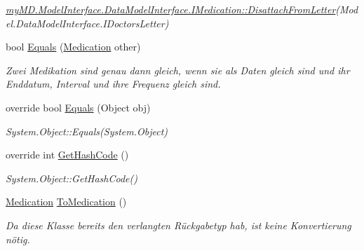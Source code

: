 \begin{CompactItemize}
\begin{CompactList}\small\item\em \hyperlink{interfacemy_m_d_1_1_model_interface_1_1_data_model_interface_1_1_i_medication_d1ca6f76b75fe87eac94cbac8bc61322}{my\-MD.Model\-Interface.Data\-Model\-Interface.IMedication::Disattach\-From\-Letter}(Model.Data\-Model\-Interface.IDoctors\-Letter) \item\end{CompactList}\item 
bool \hyperlink{classmy_m_d_1_1_model_1_1_data_model_1_1_medication_9382c5f1e8e2c50f096f26ce77672d81}{Equals} (\hyperlink{classmy_m_d_1_1_model_1_1_data_model_1_1_medication}{Medication} other)
\begin{CompactList}\small\item\em Zwei Medikation sind genau dann gleich, wenn sie als Daten gleich sind und ihr Enddatum, Interval und ihre Frequenz gleich sind. \item\end{CompactList}\item 
\hypertarget{classmy_m_d_1_1_model_1_1_data_model_1_1_medication_438d2c1653522e9aff51f785434e952d}{
override bool \hyperlink{classmy_m_d_1_1_model_1_1_data_model_1_1_medication_438d2c1653522e9aff51f785434e952d}{Equals} (Object obj)}
\label{d0/daf/classmy_m_d_1_1_model_1_1_data_model_1_1_medication_438d2c1653522e9aff51f785434e952d}

\begin{CompactList}\small\item\em System.Object::Equals(System.Object) \item\end{CompactList}\item 
\hypertarget{classmy_m_d_1_1_model_1_1_data_model_1_1_medication_871aff832c00675bb79db4294f382e58}{
override int \hyperlink{classmy_m_d_1_1_model_1_1_data_model_1_1_medication_871aff832c00675bb79db4294f382e58}{Get\-Hash\-Code} ()}
\label{d0/daf/classmy_m_d_1_1_model_1_1_data_model_1_1_medication_871aff832c00675bb79db4294f382e58}

\begin{CompactList}\small\item\em System.Object::Get\-Hash\-Code() \item\end{CompactList}\item 
\hyperlink{classmy_m_d_1_1_model_1_1_data_model_1_1_medication}{Medication} \hyperlink{classmy_m_d_1_1_model_1_1_data_model_1_1_medication_be8159bf4c393a1da18275bd4dfa8e4a}{To\-Medication} ()
\begin{CompactList}\small\item\em Da diese Klasse bereits den verlangten R\"{u}ckgabetyp hab, ist keine Konvertierung n\"{o}tig. \item\end{CompactList}\end{CompactItemize}
